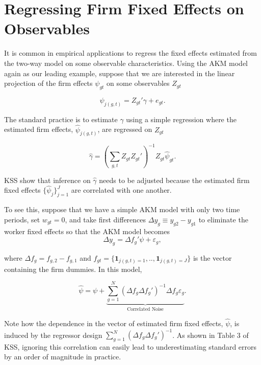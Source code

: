 \documentclass[11pt]{article}
\begin{document}
    \hypertarget{regressing-firm-fixed-effects-on-observables}{%
\section{Regressing Firm Fixed Effects on
Observables}\label{regressing-firm-fixed-effects-on-observables}}
\label{sec:lincom}
It is common in empirical applications to regress the fixed effects
estimated from the two-way model on some observable characteristics.
Using the AKM model again as our leading example, suppose that we are
interested in the linear projection of the firm effects \(\psi_{gt}\)
on some observables \(Z_{gt}\)

\begin{equation}
\psi_{j(g,t)}=Z_{gt}'\gamma+e_{gt}.
\end{equation}

The standard practice is to estimate \(\gamma\) using a simple regression
where the estimated firm effects, \(\hat{\psi}_{j(g,t)}\), are regressed
on \(Z_{gt}\)

\begin{equation}
\hat{\gamma}=\left(\sum_{g,t}Z_{gt}Z_{gt}'
\right)^{-1}Z_{gt}\hat{\psi}_{gt}.
\end{equation}

KSS show that inference on \(\hat{\gamma}\) needs to be adjusted because the estimated firm fixed effects $\{\hat{\psi}_{j}\}_{j=1}^{J}$ are correlated with one another.

To see this, suppose that we have a simple AKM model with only two time
periods, set \(w_{gt}=0\), and take first differences
\(\Delta y_{g}\equiv y_{g2}-y_{g1}\) to eliminate the worker fixed
effects so that the AKM model becomes \begin{equation}
\Delta y_{g}=\Delta f_{g}'\psi+\varepsilon_{g},
\end{equation}

where \(\Delta f_{g}=f_{g,2}-f_{g,1}\) and
\(f_{gt}=\{\mathbf{1}_{j(g,t)=1},..,\mathbf{1}_{j(g,t)=J}\}\) is the
vector containing the firm dummies. In this model,

\begin{equation}
\hat{\psi}=\psi+\underbrace{\sum_{g=1}^{N}(\Delta f_{g}\Delta f_{g}')^{-1}\Delta f_{g}\varepsilon_{g}}_{\text{Correlated Noise}}.
\end{equation}

Note how the dependence in the vector of estimated firm fixed effects,
\(\hat{\psi}\), is induced by the regressor design
\(\sum_{g=1}^{N}(\Delta f_{g}\Delta f_{g}')^{-1}\). As shown in
Table 3 of KSS, ignoring this correlation can easily lead to underestimating standard
errors by an order of magnitude in practice.
\end{document}
